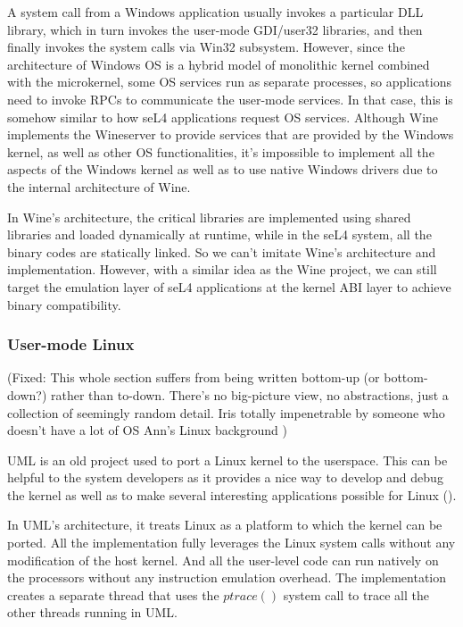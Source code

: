 A system call from a Windows application usually invokes a particular DLL library, which in turn invokes the user-mode GDI/user32 libraries, and then finally invokes the system calls via Win32 subsystem. However, since the architecture of Windows OS is a hybrid model of monolithic kernel combined with the microkernel, some OS services run as separate processes, so applications need to invoke RPCs to communicate the user-mode services. In that case, this is somehow similar to how seL4 applications request OS services. Although Wine implements the Wineserver to provide services that are provided by the Windows kernel, as well as other OS functionalities, it's impossible to implement all the aspects of the Windows kernel as well as to use native Windows drivers due to the internal architecture of Wine. 

In Wine's architecture, the critical libraries are implemented using shared libraries and loaded dynamically at runtime, while in the seL4 system, all the binary codes are statically linked. So we can't imitate Wine's architecture and implementation. However, with a similar idea as the Wine project, we can still target the emulation layer of seL4 applications at the kernel ABI layer to achieve binary compatibility.

\subsubsection{User-mode Linux}

(Fixed: This whole section suffers from being written bottom-up (or bottom-down?) rather than to-down. There's no big-picture view, no abstractions, just a collection of seemingly random detail. Iris totally impenetrable by someone who doesn't have a lot of OS Ann's Linux background )

UML is an old project used to port a Linux kernel to the userspace. This can be helpful to the system developers as it provides a nice way to develop and debug the kernel as well as to make several interesting applications possible for Linux (\cite{JD06}). 

In UML's architecture, it treats Linux as a platform to which the kernel can be ported. All the implementation fully leverages the Linux system calls without any modification of the host kernel. And all the user-level code can run natively on the processors without any instruction emulation overhead. The implementation creates a separate thread that uses the $ptrace()$ system call to trace all the other threads running in UML. 

